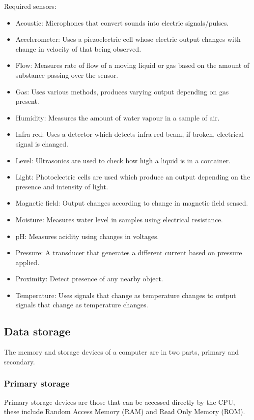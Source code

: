 \documentclass{article}
\begin{document}
Required sensors:
\begin{itemize}
	\item Acoustic: Microphones that convert sounds into electric signals/pulses.
	\item Accelerometer: Uses a piezoelectric cell whose electric output changes with
		change in velocity of that being observed.
	\item Flow: Measures rate of flow of a moving liquid or gas based on the amount of
		substance passing over the sensor.
	\item Gas: Uses various methods, produces varying output depending on gas present.
	\item Humidity: Measures the amount of water vapour in a sample of air.
	\item Infra-red: Uses a detector which detects infra-red beam, if broken, electrical
		signal is changed.
	\item Level: Ultrasonics are used to check how high a liquid is in a container.
	\item Light: Photoelectric cells are used which produce an output depending on the
		presence and intensity of light.
	\item Magnetic field: Output changes according to change in magnetic field sensed.
	\item Moisture: Measures water level in samples using electrical resistance.
	\item pH: Measures acidity using changes in voltages.
	\item Pressure: A transducer that generates a different current based on pressure
		applied.
	\item Proximity: Detect presence of any nearby object.
	\item Temperature: Uses signals that change as temperature changes to output signals
		that change as temperature changes.
\end{itemize}

\subsection{Data storage}
The memory and storage devices of a computer are in two parts, primary and secondary.

\subsubsection{Primary storage}
Primary storage devices are those that can be accessed directly by the CPU, these include
Random Access Memory (RAM) and Read Only Memory (ROM).
\end{document}
